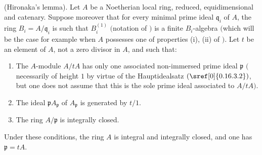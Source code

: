 \begin{proposition}[5.12.8]
\label{IV.5.12.8}
{\normalfont(Hironaka's lemma).}
Let $A$ be a Noetherian local ring, reduced, equidimensional and catenary.
Suppose moreover that for every minimal prime ideal $\mathfrak{q}_i$ of $A$, the ring $B_i=A/\mathfrak{q}_i$ is such that $B_i^{(1)}$ $($notation of $)$ is a finite $B_i$-algebra $($which will be the case for example when $A$ possesses one of properties {\rm(i), (ii)} of $)$.
Let $t$ be an element of $A$, not a zero divisor in $A$, and such that:
\begin{enumerate}
  \item[\rm(i)] The $A$-module $A/tA$ has only one associated non-immersed prime ideal $\mathfrak{p}$ $($necessarily of height $1$ by virtue of the Hauptidealsatz $(\sref[0]{0.16.3.2})$, but one does not assume that this is the sole prime ideal associated to $A/tA$$)$.
  \item[\rm(ii)] The ideal $\mathfrak{p}A_\mathfrak{p}$ of $A_\mathfrak{p}$ is generated by $t/1$.
  \item[\rm(iii)] The ring $A/\mathfrak{p}$ is integrally closed.
\end{enumerate}
Under these conditions, the ring $A$ is integral and integrally closed, and one has $\mathfrak{p}=tA$.
\end{proposition}


